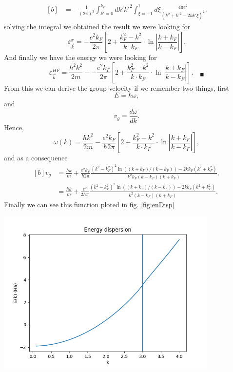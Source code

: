 \begin{questions}
\begin{solution}
\begin{equation}
\begin{aligned}[b]
    & = - \frac{1}{(2\pi)^3}\int_{k'=0}^{k_F}dk' k'^2 \int_{\xi = -1}^1 d\xi \frac{4\pi e^2}{(k^2 + k'^2 - 2kk'\xi)^2}.
  \end{aligned}
\end{equation}
solving the integral we obtained the result we were looking for
\begin{equation}
  \varepsilon_{\vec{k}}^x = -\frac{e^2k_F}{2\pi} \left[ 2 + \frac{k_F^2 - k^2}{k\cdot k_F} \cdot \ln \left| \frac{k+k_F}{k-k_F} \right| \right].
\end{equation}
And finally we have the energy we were looking for
\begin{equation}
  \varepsilon_{\vec{k}}^{HF} = \frac{\hbar^2 k^2}{2m} - -\frac{e^2k_F}{2\pi} \left[ 2 + \frac{k_F^2 - k^2}{k\cdot k_F} \cdot \ln \left| \frac{k+k_F}{k-k_F} \right| \right]. \quad _\blacksquare
\end{equation}
From this we can derive the group velocity if we remember two things, first
\begin{equation}
  E = \hbar \omega,
\end{equation}
and
\begin{equation}
  v_g = \frac{d\omega}{dk}.
\end{equation}
Hence,
\begin{equation}
  \omega(k) = \frac{\hbar k^2}{2m} -\frac{e^2k_F}{\hbar 2\pi} \left[ 2 + \frac{k_F^2 - k^2}{k\cdot k_F} \cdot \ln \left| \frac{k+k_F}{k-k_F} \right| \right],
\end{equation}
and as a consequence
\begin{equation}
  \begin{aligned}[b]
    v_g &= \frac{\hbar k}{m} + \frac{e^2k_F}{\hbar 2\pi} \frac{(k^2 - k_F^2)^2 \ln((k + k_F)/(k - k_F)) - 2 k k_F (k^2 + k_F^2)}{k^2 k_F (k - k_F) (k + k_F)}, \\
    &= \frac{\hbar k}{m} + \frac{e^2}{2\hbar\pi} \frac{(k^2 - k_F^2)^2 \ln((k + k_F)/(k - k_F)) - 2 k k_F (k^2 + k_F^2)}{k^2 (k - k_F) (k + k_F)}.
  \end{aligned}
\end{equation}
Finally we can see this function ploted in fig. \ref{fig:enDisp}
\begin{center}
  \includegraphics[width=110mm]{dispEn}
\end{center}


\end{solution}
\end{questions}
